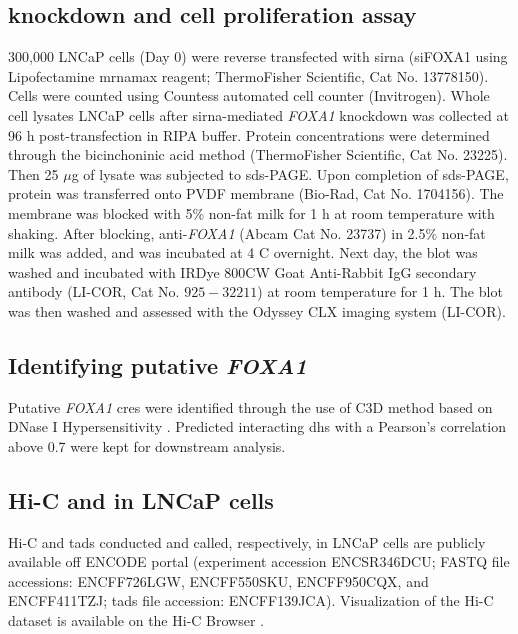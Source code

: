 \subsection{ knockdown and cell proliferation assay}

300,000 LNCaP cells (Day 0) were reverse transfected with \gls{sirna} (siFOXA1 using Lipofectamine \gls{mrna}max reagent; ThermoFisher Scientific, Cat No. 13778150).
Cells were counted using Countess automated cell counter (Invitrogen).
Whole cell lysates LNCaP cells after \gls{sirna}-mediated \emph{FOXA1} knockdown was collected at 96 h post-transfection in RIPA buffer.
Protein concentrations were determined through the bicinchoninic acid method (ThermoFisher Scientific, Cat No. 23225).
Then 25 $\mu$g of lysate was subjected to \gls{sds}-PAGE.
Upon completion of \gls{sds}-PAGE, protein was transferred onto PVDF membrane (Bio-Rad, Cat No. 1704156).
The membrane was blocked with 5\% non-fat milk for 1 h at room temperature with shaking.
After blocking, anti-\emph{FOXA1} (Abcam Cat No. 23737) in 2.5\% non-fat milk was added, and was incubated at 4 \textdegree C overnight.
Next day, the blot was washed and incubated with IRDye 800CW Goat Anti-Rabbit IgG secondary antibody (LI-COR, Cat No. $925-32211$) at room temperature for 1 h.
The blot was then washed and assessed with the Odyssey CLX imaging system (LI-COR).

\subsection{Identifying putative \emph{FOXA1} }

Putative \emph{FOXA1} \glspl{cre} were identified through the use of C3D method based on DNase I Hypersensitivity \cite{mehdiC3DToolPredict2019}.
Predicted interacting \gls{dhs} with a Pearson's correlation above 0.7 \cite{thurmanAccessibleChromatinLandscape2012} were kept for downstream analysis.

\subsection{Hi-C and  in LNCaP cells}

Hi-C and \glspl{tad} conducted and called, respectively, in LNCaP cells are publicly available off ENCODE portal (experiment accession ENCSR346DCU; FASTQ file accessions: ENCFF726LGW, ENCFF550SKU, ENCFF950CQX, and ENCFF411TZJ; \glspl{tad} file accession: ENCFF139JCA).
Visualization of the Hi-C dataset is available on the Hi-C Browser \cite{wang3DGenomeBrowser2018}.

